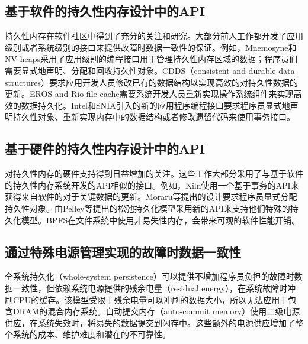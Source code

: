 \subsection{基于软件的持久性内存设计中的API}
持久性内存在软件社区中得到了充分的关注和研究\cite{Volos:2011:MLP:1950365.1950379,
Coburn:2011:NMP:1950365.1950380,
Venkataraman:2011:CDD:1960475.1960480, Intel:PMEM, SNIA:2013:NPM,
Shapiro:1999:EFC:319151.319163, Chen:1996:RFC:237090.237154}。大部分前人工作都开发了应用级别或者系统级别的接口来提供故障时数据一致性的保证。例如，Mnemosyne\cite{Volos:2011:MLP:1950365.1950379}和NV-heaps\cite{Coburn:2011:NMP:1950365.1950380}采用了应用级别的编程接口用于管理持久性内存区域的数据；程序员们需要显式地声明、分配和回收持久性对象。CDDS（consistent and durable data structures）\cite{Venkataraman:2011:CDD:1960475.1960480}要求应用开发人员修改已有的数据结构以实现高效的对持久性数据的更新。EROS\cite{Shapiro:1999:EFC:319151.319163}
and Rio file cache\cite{Chen:1996:RFC:237090.237154}需要系统开发人员重新实现操作系统组件来实现高效的数据持久化。Intel\cite{Intel:PMEM}和SNIA\cite{SNIA:2013:NPM}引入的新的应用程序编程接口要求程序员显式地声明持久性对象\cite{Volos:2011:MLP:1950365.1950379,
Coburn:2011:NMP:1950365.1950380}、重新实现内存中的数据结构\cite{Venkataraman:2011:CDD:1960475.1960480}或者修改遗留代码来使用事务接口\cite{Volos:2011:MLP:1950365.1950379,Coburn:2011:NMP:1950365.1950380}。

\subsection{基于硬件的持久性内存设计中的API}
对持久性内存的硬件支持得到日益增加的关注\cite{meza2013case, Condit:2009:BIT:1629575.1629589,
Zhao:2013:KCP:2540708.2540744, Moraru:2013:CDS, Pelley:2013:SMN,
Kannan:2014:RCP, Liu:2014:NDU:2541940.2541957, Pelley:2014:MP,
6378661, 6974684, Zhao:2014:FFH, justin-taco14}。这些工作大部分采用了与基于软件的持久性内存系统开发的API相似的接口。例如，Kiln\cite{Zhao:2013:KCP:2540708.2540744}使用一个基于事务的API来获得来自软件的对于关键数据的更新。Moraru等\cite{Moraru:2013:CDS}提出的设计要求程序员显式分配持久性对象。由Pelley等\cite{Pelley:2014:MP}提出的松弛持久化模型采用新的API来支持他们特殊的持久化模型。BPFS\cite{Condit:2009:BIT:1629575.1629589}在文件系统中使用非易失性内存，会带来可观的软件性能开销。

\subsection{通过特殊电源管理实现的故障时数据一致性}
全系统持久化（whole-system persistence）\cite{Narayanan:2012:WP:2150976.2151018}可以提供不增加程序员负担的故障时数据一致性，但依赖系统电源提供的残余电量（residual energy），在系统故障时冲刷CPU的缓存。该模型受限于残余电量可以冲刷的数据大小，所以无法应用于包含DRAM的混合内存系统。自动提交内存（auto-commit memory）\cite{flynn2012apparatus}使用二级电源供应，在系统失效时，将易失的数据提交到闪存中。这些额外的电源供应增加了整个系统的成本、维护难度和潜在的不可靠性。


